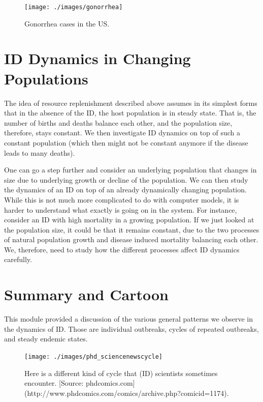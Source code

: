 \documentclass[
]{book}
\begin{document}
\begin{figure}
\texttt{[image: ./images/gonorrhea]} \caption{Gonorrhea cases in the US.}\label{fig:gonorrheapattern}
\end{figure}

\hypertarget{id-dynamics-in-changing-populations}{%
\section{ID Dynamics in Changing Populations}\label{id-dynamics-in-changing-populations}}

The idea of resource replenishment described above assumes in its simplest forms that in the absence of the ID, the host population is in steady state. That is, the number of births and deaths balance each other, and the population size, therefore, stays constant. We then investigate ID dynamics on top of such a constant population (which then might not be constant anymore if the disease leads to many deaths).

One can go a step further and consider an underlying population that changes in size due to underlying growth or decline of the population. We can then study the dynamics of an ID on top of an already dynamically changing population. While this is not much more complicated to do with computer models, it is harder to understand what exactly is going on in the system. For instance, consider an ID with high mortality in a growing population. If we just looked at the population size, it could be that it remains constant, due to the two processes of natural population growth and disease induced mortality balancing each other. We, therefore, need to study how the different processes affect ID dynamics carefully.

\hypertarget{summary-and-cartoon-2}{%
\section{Summary and Cartoon}\label{summary-and-cartoon-2}}

This module provided a discussion of the various general patterns we observe in the dynamics of ID. Those are individual outbreaks, cycles of repeated outbreaks, and steady endemic states.

\begin{figure}
\texttt{[image: ./images/phd\_sciencenewscycle]} \caption{Here is a different kind of cycle that (ID) scientists sometimes encounter. [Source: phdcomics.com](http://www.phdcomics.com/comics/archive.php?comicid=1174).}\label{fig:sciencenewscycle}
\end{figure}
\end{document}
